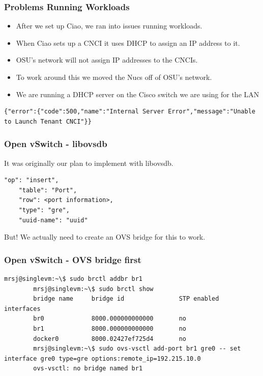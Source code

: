 \documentclass[pdf]{beamer}
\begin{document}
\begin{frame}[fragile]
	\frametitle{Problems Running Workloads}
	\begin{itemize}
		\item After we set up Ciao, we ran into issues running workloads.
		\item When Ciao sets up a CNCI it uses DHCP to assign an IP address to it.
		\item OSU's network will not assign IP addresses to the CNCIs.
		\item To work around this we moved the Nucs off of OSU's network.
		\item We are running a DHCP server on the Cisco switch we are using for the LAN
	\end{itemize}

	\begin{lstlisting}[caption=CNCI error]
{"error":{"code":500,"name":"Internal Server Error","message":"Unable to Launch Tenant CNCI"}}
	\end{lstlisting}
\end{frame}

\begin{frame}
	\frametitle{Open vSwitch - libovsdb}
	It was originally our plan to implement with libovsdb.

	\begin{lstlisting}[caption=libovsdb insert operation]
	"op": "insert",
	"table": "Port",
	"row": <port information>,
	"type": "gre",
	"uuid-name": "uuid"
	\end{lstlisting}

	But! We actually need to create an OVS bridge for this to work.

\end{frame}

\begin{frame}
	\frametitle{Open vSwitch - OVS bridge first}

	\begin{lstlisting}[caption=No Linux Bridge and OVS Tunnel]
		mrsj@singlevm:~\$ sudo brctl addbr br1
		mrsj@singlevm:~\$ sudo brctl show
		bridge name     bridge id               STP enabled     interfaces
		br0             8000.000000000000       no
		br1             8000.000000000000       no
		docker0         8000.02427ef725d4       no
		mrsj@singlevm:~\$ sudo ovs-vsctl add-port br1 gre0 -- set interface gre0 type=gre options:remote_ip=192.215.10.0
		ovs-vsctl: no bridge named br1
	\end{lstlisting}
\end{frame}
\end{document}
